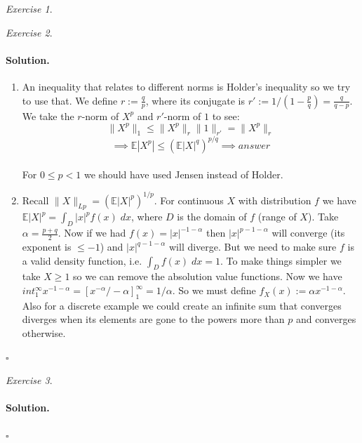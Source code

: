 \documentclass[11pt]{article}
\theoremstyle{definition}
\theoremstyle{remark}
\newtheorem{exercise}{Exercise}[section]
\newenvironment{solution}{\paragraph{Solution.}}{\hfill$\square$\medskip}
\newcommand{\E}{\mathbb{E}}
\newcommand{\1}{\mathbf{1}}
\begin{document}
\begin{exercise}
	
\end{exercise}

\begin{exercise}
	
\end{exercise}

\begin{solution}
	
	\begin{enumerate}
		\item An inequality that relates to different norms is Holder's inequality so we try to use that. We define \(r:= \frac{q}{p}\), where its conjugate is \(r' := 1/(1 - \frac{p}{q}) = \frac{q}{q-p}\). We take the \(r\)-norm of \(X^{p}\) and \(r'\)-norm of \(1\) to see: 
		\[
		 \|X^p\|_1 \leq \|X^p\|_r \|1\|_{r'} =  \|X^p\|_r
		\]
		\[
		 \implies \E|X^p| \leq (\E|X|^{q})^{p/q} \implies answer
		\]
		\\
		For \(0 \leq p < 1\) we should have used Jensen instead of Holder.
		
		\item Recall \( \|X\|_{Lp} = (\E |X|^p )^{1/p}\). For continuous \(X\) with distribution \(f\) we have  \(\E |X|^p = \int_D |x|^p f(x) \; dx\), where \(D\) is the domain of \(f\) (range of \(X\)). Take \(\alpha = \frac{p+q}{2}\). Now if we had \(f(x)=|x|^{-1-\alpha}\) then \(|x|^{p-1-\alpha}\) will converge (its exponent is \(\leq -1\)) and \(|x|^{q-1-\alpha}\) will diverge. But we need to make sure \(f\) is a valid density function, i.e. \( \int_D f(x)\; dx =1\). To make things simpler we take \(X \geq 1\) so we can remove the absolution value functions. Now we have \(int_{1}^\infty x^{-1-\alpha} = [x^{-\alpha}/-\alpha]_1^\infty = 1/\alpha\). So we must define \(f_X(x) := \alpha x^{-1-\alpha}\).
		\\
		Also for a discrete example we could create an infinite sum that converges diverges when its elements are gone to the powers more than \(p\) and converges otherwise.
	\end{enumerate}

\end{solution}

\begin{exercise}
	
\end{exercise}

\begin{solution}
	
\end{solution}
\end{document}

